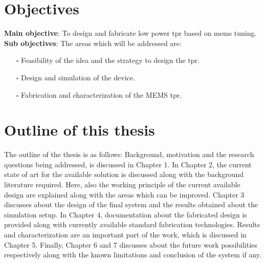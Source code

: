 \documentclass[../report.tex]{subfiles}
\begin{document}
	\section{Objectives}
\textbf{Main objective}: To design and fabricate low power \gls{tpr} based on \gls{mems} tuning. \\

\noindent \textbf{Sub objectives}: The areas which will be addressed are:
\begin{itemize}
	\item[$\square$] Feasibility of the idea and the strategy to design the \gls{tpr}. 
	\item[$\square$] Design and simulation of the device.
	\item[$\square$] Fabrication and characterization of the MEMS \gls{tpr}.
\end{itemize}
	
	\section{Outline of this thesis}
The outline of the thesis is as follows: Background, motivation and the research questions being addressed, is discussed in Chapter 1. In Chapter 2, the current state of art for the available solution is discussed along with the background literature required. Here, also the working principle of the current available design are explained along with the areas which can be improved. Chapter 3 discusses about the design of the final system and the results obtained about the simulation setup. In Chapter 4, documentation about the fabricated design is provided along with currently available standard fabrication technologies. Results and characterization are an important part of the work, which is discussed in Chapter 5. Finally, Chapter 6 and 7 discusses about the future work possibilities respectively along with the known limitations and conclusion of the system if any.  
	
\end{document}
